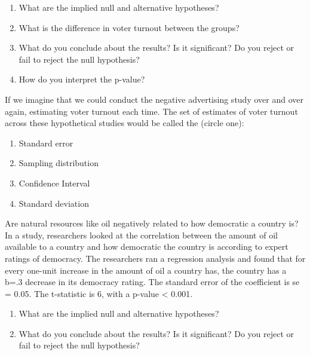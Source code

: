 \documentclass[
  letterpaper,
  DIV=11,
  numbers=noendperiod]{scrreprt}
\providecommand{\tightlist}{%
  \setlength{\itemsep}{0pt}\setlength{\parskip}{0pt}}\usepackage{longtable,booktabs,array}
\begin{document}
\begin{enumerate}
\def\labelenumi{\arabic{enumi}.}
\tightlist
\item
  What are the implied null and alternative hypotheses?
\item
  What is the difference in voter turnout between the groups?
\item
  What do you conclude about the results? Is it significant? Do you
  reject or fail to reject the null hypothesis?
\item
  How do you interpret the p-value?
\end{enumerate}

If we imagine that we could conduct the negative advertising study over
and over again, estimating voter turnout each time. The set of estimates
of voter turnout across these hypothetical studies would be called the
(circle one):

\begin{enumerate}
\def\labelenumi{\Alph{enumi}.}
\tightlist
\item
  Standard error
\item
  Sampling distribution
\item
  Confidence Interval
\item
  Standard deviation
\end{enumerate}

Are natural resources like oil negatively related to how democratic a
country is? In a study, researchers looked at the correlation between
the amount of oil available to a country and how democratic the country
is according to expert ratings of democracy. The researchers ran a
regression analysis and found that for every one-unit increase in the
amount of oil a country has, the country has a b=.3 decrease in its
democracy rating. The standard error of the coefficient is se = 0.05.
The t-statistic is 6, with a p-value \textless{} 0.001.

\begin{enumerate}
\def\labelenumi{\arabic{enumi}.}
\tightlist
\item
  What are the implied null and alternative hypotheses?
\item
  What do you conclude about the results? Is it significant? Do you
  reject or fail to reject the null hypothesis?
\end{enumerate}
\end{document}
